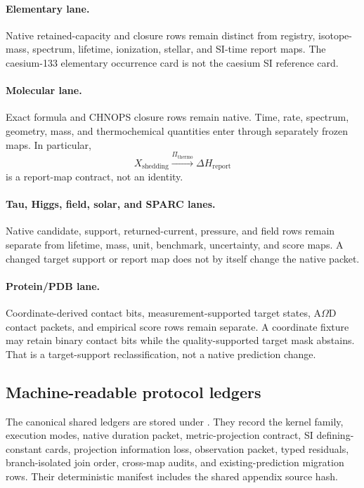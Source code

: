 \paragraph{Elementary lane.}
Native retained-capacity and closure rows remain distinct from registry, isotope-mass, spectrum, lifetime, ionization, stellar, and SI-time report maps.  The caesium-133 elementary occurrence card is not the caesium SI reference card.

\paragraph{Molecular lane.}
Exact formula and CHNOPS closure rows remain native.  Time, rate, spectrum, geometry, mass, and thermochemical quantities enter through separately frozen maps.  In particular,
\[
X_{\mathrm{shedding}}\xrightarrow{\Pi_{\mathrm{thermo}}}\Delta H_{\mathrm{report}}
\]
is a report-map contract, not an identity.

\paragraph{Tau, Higgs, field, solar, and SPARC lanes.}
Native candidate, support, returned-current, pressure, and field rows remain separate from lifetime, mass, unit, benchmark, uncertainty, and score maps.  A changed target support or report map does not by itself change the native packet.

\paragraph{Protein/PDB lane.}
Coordinate-derived contact bits, measurement-supported target states, A$\Omega$D contact packets, and empirical score rows remain separate.  A coordinate fixture may retain binary contact bits while the quality-supported target mask abstains.  That is a target-support reclassification, not a native prediction change.

\subsection{Machine-readable protocol ledgers}

The canonical shared ledgers are stored under
.  They record the kernel family, execution modes, native duration packet, metric-projection contract, SI defining-constant cards, projection information loss, observation packet, typed residuals, branch-isolated join order, cross-map audits, and existing-prediction migration rows.  Their deterministic manifest includes the shared appendix source hash.

